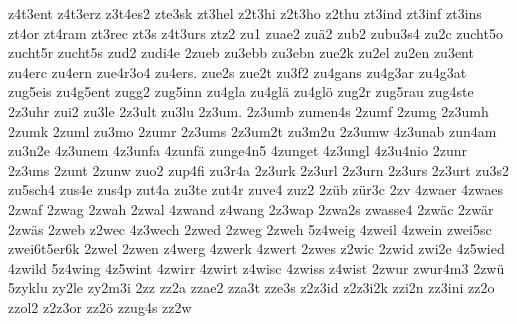 {z4t3ent
z4t3erz
z3t4es2
zte3sk
zt3hel
z2t3hi
z2t3ho
z2thu
zt3ind
zt3inf
zt3ins
zt4or
zt4ram
zt3rec
zt3s
z4t3urs
ztz2
zu1
zuae2
zuä2
zub2
zubu3s4
zu2c
zucht5o
zucht5r
zucht5s
zud2
zudi4e
2zueb
zu3ebb
zu3ebn
zue2k
zu2el
zu2en
zu3ent
zu4erc
zu4ern
zue4r3o4
zu4ers.
zue2s
zue2t
zu3f2
zu4gans
zu4g3ar
zu4g3at
zug5eis
zu4g5ent
zugg2
zug5inn
zu4gla
zu4glä
zu4glö
zug2r
zug5rau
zug4ste
2z3uhr
zui2
zu3le
2z3ult
zu3lu
2z3um.
2z3umb
zumen4s
2zumf
2zumg
2z3umh
2zumk
2zuml
zu3mo
2zumr
2z3ums
2z3um2t
zu3m2u
2z3umw
4z3unab
zun4am
zu3n2e
4z3unem
4z3unfa
4zunfä
zunge4n5
4zunget
4z3ungl
4z3u4nio
2zunr
2z3uns
2zunt
2zunw
zuo2
zup4fi
zu3r4a
2z3urk
2z3url
2z3urn
2z3urs
2z3urt
zu3s2
zu5sch4
zus4e
zus4p
zut4a
zu3te
zut4r
zuve4
zuz2
2züb
zür3c
2zv
4zwaer
4zwaes
2zwaf
2zwag
2zwah
2zwal
4zwand
z4wang
2z3wap
2zwa2s
zwasse4
2zwäc
2zwär
2zwäs
2zweb
z2wec
4z3wech
2zwed
2zweg
2zweh
5z4weig
4zweil
4zwein
zwei5sc
zwei6t5er6k
2zwel
2zwen
z4werg
4zwerk
4zwert
2zwes
z2wic
2zwid
zwi2e
4z5wied
4zwild
5z4wing
4z5wint
4zwirr
4zwirt
z4wisc
4zwiss
z4wist
2zwur
zwur4m3
2zwü
5zyklu
zy2le
zy2m3i
2zz
zz2a
zzae2
zza3t
zze3s
z2z3id
z2z3i2k
zzi2n
zz3ini
zz2o
zzol2
z2z3or
zz2ö
zzug4s
zz2w
}

\endinput

